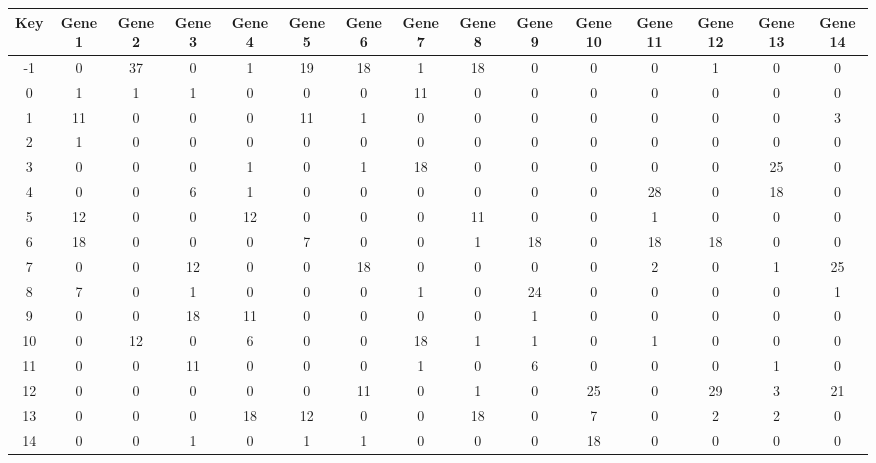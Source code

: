 \begin{tabular}{|c|c|c|c|c|c|c|c|c|c|c|c|c|c|c|}
\hline
Key & Gene 1 & Gene 2 & Gene 3 & Gene 4 & Gene 5 & Gene 6 & Gene 7 & Gene 8 & Gene 9 & Gene 10 & Gene 11 & Gene 12 & Gene 13 & Gene 14 \\
\hline
-1 & 0 & 37 & 0 & 1 & 19 & 18 & 1 & 18 & 0 & 0 & 0 & 1 & 0 & 0 \\
0 & 1 & 1 & 1 & 0 & 0 & 0 & 11 & 0 & 0 & 0 & 0 & 0 & 0 & 0 \\
1 & 11 & 0 & 0 & 0 & 11 & 1 & 0 & 0 & 0 & 0 & 0 & 0 & 0 & 3 \\
2 & 1 & 0 & 0 & 0 & 0 & 0 & 0 & 0 & 0 & 0 & 0 & 0 & 0 & 0 \\
3 & 0 & 0 & 0 & 1 & 0 & 1 & 18 & 0 & 0 & 0 & 0 & 0 & 25 & 0 \\
4 & 0 & 0 & 6 & 1 & 0 & 0 & 0 & 0 & 0 & 0 & 28 & 0 & 18 & 0 \\
5 & 12 & 0 & 0 & 12 & 0 & 0 & 0 & 11 & 0 & 0 & 1 & 0 & 0 & 0 \\
6 & 18 & 0 & 0 & 0 & 7 & 0 & 0 & 1 & 18 & 0 & 18 & 18 & 0 & 0 \\
7 & 0 & 0 & 12 & 0 & 0 & 18 & 0 & 0 & 0 & 0 & 2 & 0 & 1 & 25 \\
8 & 7 & 0 & 1 & 0 & 0 & 0 & 1 & 0 & 24 & 0 & 0 & 0 & 0 & 1 \\
9 & 0 & 0 & 18 & 11 & 0 & 0 & 0 & 0 & 1 & 0 & 0 & 0 & 0 & 0 \\
10 & 0 & 12 & 0 & 6 & 0 & 0 & 18 & 1 & 1 & 0 & 1 & 0 & 0 & 0 \\
11 & 0 & 0 & 11 & 0 & 0 & 0 & 1 & 0 & 6 & 0 & 0 & 0 & 1 & 0 \\
12 & 0 & 0 & 0 & 0 & 0 & 11 & 0 & 1 & 0 & 25 & 0 & 29 & 3 & 21 \\
13 & 0 & 0 & 0 & 18 & 12 & 0 & 0 & 18 & 0 & 7 & 0 & 2 & 2 & 0 \\
14 & 0 & 0 & 1 & 0 & 1 & 1 & 0 & 0 & 0 & 18 & 0 & 0 & 0 & 0 \\
\hline
\end{tabular}